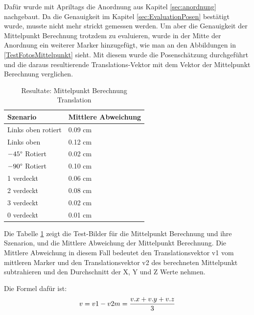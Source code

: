 Dafür wurde mit Apriltags die Anordnung aus Kapitel \ref{sec:anordnung} nachgebaut. 
Da die Genauigkeit im Kapitel \ref{sec:EvaluationPosen} bestätigt wurde, musste nicht mehr strickt gemessen werden.
Um aber die Genauigkeit der Mittelpunkt Berechnung trotzdem zu evaluieren, wurde in der Mitte der Anordnung ein weiterer Marker hinzugefügt, wie man an den Abbildungen in \ref{TestFotosMittelpunkt} sieht.
Mit diesem wurde die Posenschätzung durchgeführt und die daraus resultierende Translations-Vektor mit dem Vektor der Mittelpunkt Berechnung verglichen.

\begin{table}[!htb]
    \caption{Resultate: Mittelpunkt Berechnung Translation}
    \label{tab:MittelpunktTranslation}
        \begin{tabular}{|l|l|}
            \hline
            Szenario &  Mittlere Abweichung\\
            \hline
            Links oben rotiert & 0.09 cm\\
            \hline
            Links oben & 0.12 cm\\
            \hline
            \(-45 \degree\) Rotiert & 0.02 cm\\
            \hline
            \(-90 \degree\) Rotiert& 0.10 cm\\
            \hline
            1 verdeckt & 0.06 cm\\
            \hline
            2 verdeckt & 0.08 cm\\
            \hline
            3 verdeckt & 0.02 cm\\
            \hline
            0 verdeckt & 0.01 cm\\
            \hline
        \end{tabular}
\end{table}

Die Tabelle \ref{tab:MittelpunktTranslation} zeigt die Test-Bilder für die Mittelpunkt Berechnung und ihre Szenarion, und die Mittlere Abweichung der Mittelpunkt Berechnung.
Die Mittlere Abweichung in diesem Fall bedeutet den Translationsvektor v1 vom mittleren Marker und den Translationsvektor v2 des berechneten Mittelpunkt subtrahieren und den Durchschnitt der X, Y und Z Werte nehmen. 

Die Formel dafür ist: 
\begin{equation}
    v = v1 - v2 \\
    m = \frac{v.x + v.y + v.z}{3}
    \label{eq:mittlereAbweichung}
\end{equation}

